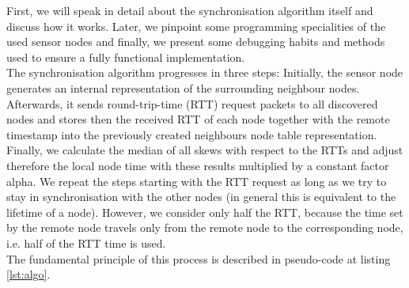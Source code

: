 \documentclass{llncs}
\begin{document}
First, we will speak in detail about the synchronisation algorithm itself and discuss how it works. Later, we pinpoint some programming specialities of the used sensor nodes and finally, we present some debugging habits and methods used to ensure a fully functional implementation.\\
\noindent The synchronisation algorithm progresses in three steps: Initially, the sensor node generates an internal representation of the surrounding neighbour nodes. Afterwards, it sends round-trip-time (RTT) request packets to all discovered nodes and stores then the received RTT of each node together with the remote timestamp into the previously created neighbours node table representation. Finally, we calculate the median of all skews with respect to the RTTs and adjust therefore the local node time with these results multiplied by a constant factor alpha. We repeat the steps starting with the RTT request as long as we try to stay in synchronisation with the other nodes (in general this is equivalent to the lifetime of a node).
However, we consider only half the RTT, because the time set by the remote node travels only from the remote node to the corresponding node, i.e. half of the RTT time is used.\\
The fundamental principle of this process is described in pseudo-code at listing \ref{lst:algo}.
\end{document}
